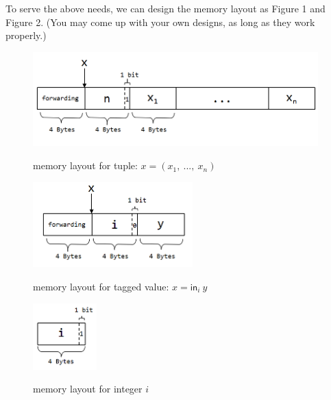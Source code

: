 \documentclass{article}
\theoremstyle{definition}
\theoremstyle{remark}
\numberwithin{equation}{section}
\begin{document}
To serve the above needs, we can design the memory layout as Figure 1 and Figure 2.
(You may come up with your own designs, as long as they work properly.)

\begin{figure}
  \centering
  \includegraphics[width=0.98\textwidth]{tuple_gc.png}\\
  \caption{memory layout for tuple: $x=(x_1,\ ...,\ x_n)$}\label{fig:digit}
\end{figure}

\begin{figure}
  \centering
  \includegraphics[width=0.55\textwidth]{tag_gc.png}\\
  \caption{memory layout for tagged value: $x=\textsf{in}_i\ y$}\label{fig:digit}
\end{figure}

\begin{figure}
  \centering
  \includegraphics[width=0.22\textwidth]{int_gc.png}\\
  \caption{memory layout for integer $i$}\label{fig:digit}
\end{figure}
\end{document}
